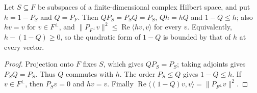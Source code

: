 \begin{lemma}
    \label{lem:gap_supported_projection}
    \leanok
    Let $S\subseteq F$ be subspaces of a finite-dimensional complex Hilbert space, and
    put $h=1-P_S$ and $Q=P_F$. Then $QP_S=P_SQ=P_S$, $Qh=hQ$ and $1-Q\le h$; also
    $hv=v$ for $v\in F^\perp$, and
    $\lVert P_{F^\perp}v\rVert^2\le\operatorname{Re}\langle hv,v\rangle$ for every $v$.
    Equivalently, $h-(1-Q)\ge0$, so the quadratic form of $1-Q$ is bounded by that
    of $h$ at every vector.
\end{lemma}
\begin{proof}\leanok
    Projection onto $F$ fixes $S$, which gives $QP_S=P_S$; taking adjoints gives
    $P_SQ=P_S$. Thus $Q$ commutes with $h$. The order $P_S\le Q$ gives $1-Q\le h$. If
    $v\in F^\perp$, then $P_Sv=0$ and $hv=v$. Finally
    $\operatorname{Re}\langle(1-Q)v,v\rangle=\lVert P_{F^\perp}v\rVert^2$.
\end{proof}

